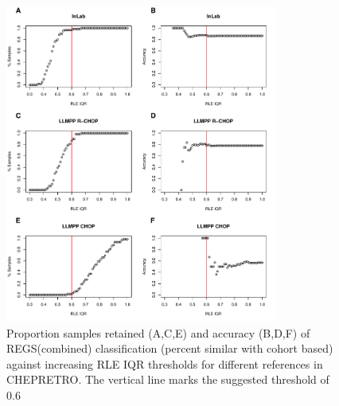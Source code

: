 \begin{figure}
	\begin{center}
		\includegraphics[width=0.8\textwidth]{figures/chep_rle_classification_regs.pdf}
	\end{center}
	\caption{Proportion samples retained (A,C,E) and accuracy (B,D,F) of REGS(combined) classification (percent similar with cohort based) against increasing RLE IQR thresholds for different references in CHEPRETRO. The vertical line marks the suggested threshold of 0.6}
	\label{fig:chep_rle_clas_regs}
\end{figure}

